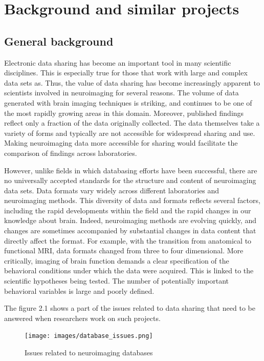 \chapter{Background and similar projects}
\section{General background}
\par
Electronic data sharing has become an important tool in many scientific disciplines. This is especially true for those that work with large and complex data sets as. Thus, the value of data sharing has become increasingly apparent to scientists involved in neuroimaging for several reasons. The volume of data generated with brain imaging techniques is striking, and continues to be one of the most rapidly growing areas in this domain. Moreover, published findings reflect only a fraction of the data originally collected. The data themselves take a variety of forms and typically are not accessible for widespread sharing and use. Making neuroimaging data more accessible for sharing would facilitate the comparison of findings across laboratories.
\par
However, unlike fields in which databasing efforts have been successful, there are no universally accepted standards for the structure and content of neuroimaging data sets. Data formats vary widely across different laboratories and neuroimaging methods. This diversity of data and formats reflects several factors, including the rapid developments within the field and the rapid changes in our knowledge about brain. Indeed, neuroimaging methods are evolving quickly, and changes are sometimes accompanied by substantial changes in data content that directly affect  the format. For example, with the transition from anatomical to functional MRI, data formats changed from three to four dimensional. More critically, imaging of brain function demands a clear specification of the behavioral conditions under which the data were acquired. This is linked to the scientific hypotheses being tested. The number of potentially important behavioral variables is large and poorly defined.
\par
The figure 2.1 shows a part of the issues related to data sharing that need to be answered when researchers work on such projects.
\begin{figure}[!h]
\begin{center}
\texttt{[image: images/database\_issues.png]}
\caption{\small Issues related to neuroimaging databases}
\end{center}
\end{figure}
